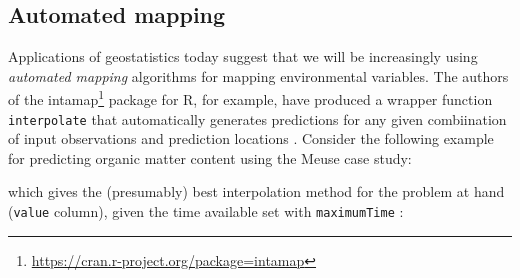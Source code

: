 \documentclass[graybox,natbib,nospthms,UStrade]{svmono}
\newenvironment{Shaded}{\begin{snugshade}}{\end{snugshade}}
\newcommand{\CommentTok}[1]{\textcolor[rgb]{0.37,0.37,0.37}{\textit{#1}}}
\newcommand{\DataTypeTok}[1]{\textcolor[rgb]{0.27,0.27,0.27}{#1}}
\newcommand{\KeywordTok}[1]{\textcolor[rgb]{0.27,0.27,0.27}{\textbf{#1}}}
\newcommand{\NormalTok}[1]{#1}
\newcommand{\OperatorTok}[1]{\textcolor[rgb]{0.43,0.43,0.43}{\textbf{#1}}}
\newcommand{\OtherTok}[1]{\textcolor[rgb]{0.37,0.37,0.37}{#1}}
\newcommand{\StringTok}[1]{\textcolor[rgb]{0.5,0.5,0.5}{#1}}
\renewcommand{\href}[2]{#2 (\url{#1})}
\renewcommand{\href}[2]{#2\footnote{\url{#1}}}
\begin{document}
\hypertarget{automated-mapping}{%
\subsection{Automated mapping}\label{automated-mapping}}

Applications of geostatistics today suggest that we will be increasingly
using \emph{automated mapping} algorithms for mapping environmental
variables. The authors of the \href{https://cran.r-project.org/package=intamap}{intamap} package for R, for example, have
produced a wrapper function \texttt{interpolate} that automatically generates
predictions for any given combiination of input observations and prediction locations
\citep{Pebesma2011CompGeoSci}. Consider the following example for predicting
organic matter content using the Meuse case study:

\begin{Shaded}
\end{Shaded}

which gives the (presumably) best interpolation method for the problem
at hand (\texttt{value} column), given the time available set with
\texttt{maximumTime} \citep{Pebesma2011CompGeoSci}:
\end{document}

